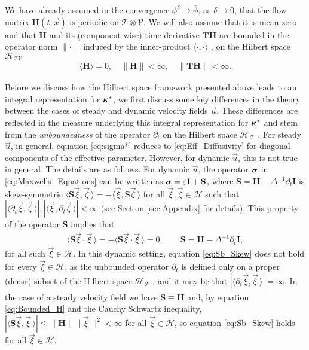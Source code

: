 \documentclass[11pt]{amsart}
\newcommand{\Tb}{\mathbf{T}}
\newcommand{\Hb}{\mathbf{H}}
\newcommand{\Ib}{\mathbf{I}}
\newcommand{\Sb}{\mathbf{S}}
\newcommand{\Tc}{\mathcal{T}}
\newcommand{\Vc}{\mathcal{V}}
\newcommand{\Hs}{\mathscr{H}}
\newcommand\bsig{\mbox{\boldmath${\sigma}$}}
\newcommand\bkappa{\mbox{\boldmath${\kappa}$}}
\begin{document}
We have already
assumed in the convergence $\phi^\delta\to\bar{\phi}$, as $\delta\to0$, that the flow
matrix $\Hb(t,\vec{x})$ is periodic on $\Tc\otimes\Vc$. We will also assume
that it is mean-zero and that $\Hb$ and its (component-wise) time
derivative $\Tb\Hb$ are bounded in the operator norm $\|\cdot\|$ induced by
the inner-product $\langle\cdot,\cdot\rangle$ \cite{Reed-1980,Stone:64,Stakgold:BVP:2000},
on the Hilbert space $\Hs_{\Tc\Vc}$ 
%
\begin{align}\label{eq:Bounded_H}
  \langle\Hb\rangle=0, \quad \|\Hb\|<\infty, \quad \|\Tb\Hb\|<\infty.
\end{align}
%







Before we discuss how the Hilbert space framework presented above
leads to an  integral representation for $\bkappa^*$, we first
discuss some key differences in the theory between the cases of steady
and dynamic velocity fields $\vec{u}$. These differences are reflected
in the measure underlying this integral representation for $\bkappa^*$
and stem from the \emph{unboundedness} of the operator $\partial_t$ on the
Hilbert space $\Hs_{\,\Tc}$ \cite{Reed-1980,Stone:64}. For steady
$\vec{u}$, in general, equation \eqref{eq:sigma*} reduces to
\eqref{eq:Eff_Diffusivity} for  diagonal components of the effective
parameter.  However, for dynamic $\vec{u}$, this is not true in
general. The details are as follows. For dynamic $\vec{u}$, the
operator $\bsig$ in \eqref{eq:Maxwells_Equations} can be written as
$\bsig=\varepsilon\Ib+\Sb$, where  $\Sb=\Hb-\Delta^{-1}\partial_t\Ib$ is skew-symmetric 
$\langle\Sb\vec{\xi},\vec{\zeta}\,\rangle=-\langle\vec{\xi},\Sb\vec{\zeta}\,\rangle$ for all
$\vec{\xi},\vec{\zeta}\in\Hs$ such that
$|\langle\partial_t\vec{\xi},\vec{\zeta}\,\rangle|,|\langle\vec{\xi},\partial_t\vec{\zeta}\,\rangle|<\infty$ (see Section
\ref{sec:Appendix} for details).  
This property of the operator $\Sb$ implies that
%
\begin{align}\label{eq:Sb_Skew_2}
  \langle\Sb\vec{\xi}\cdot\vec{\xi}\,\rangle=-\langle\Sb\vec{\xi}\cdot\vec{\xi}\,\rangle=0,
  \qquad
  \Sb=\Hb-\Delta^{-1}\partial_t\Ib,
\end{align}
%
for all such $\vec{\xi}\in\Hs$. In this dynamic setting, equation
\eqref{eq:Sb_Skew} does not hold for every $\vec{\xi}\in\Hs$, as the
unbounded operator $\partial_t$ is defined only on a proper (dense) subset of
the Hilbert space $\Hs_{\,\Tc}$ \cite{Reed-1980}, and it may be that
$|\langle\partial_t\vec{\xi},\vec{\xi}\,\rangle|=\infty$. In the case of a steady velocity field
we have $\Sb\equiv\Hb$ and, by equation \eqref{eq:Bounded_H} and the Cauchy
Schwartz inequality, $|\langle\Sb\vec{\xi},\vec{\xi}\,\rangle|\leq\|\Hb\|\|\vec{\xi}\,\|^2<\infty$ for
all $\vec{\xi}\in\Hs$, so equation \eqref{eq:Sb_Skew} holds for all
$\vec{\xi}\in\Hs$.   
\end{document}
